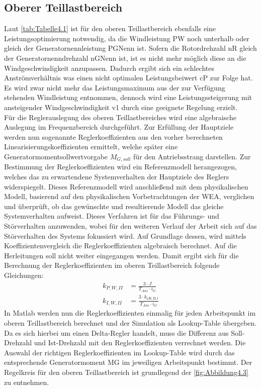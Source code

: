 \subsection{Oberer Teillastbereich}
Laut \autoref{tab:Tabelle4.1} ist für den oberen Teillastbereich ebenfalls eine Leistungsoptimierung notwendig, da die Windleistung \acs{PW} noch unterhalb oder gleich der Generatornennleistung \acs{PGNenn} ist. Sofern die Rotordrehzahl \acs{nR} gleich der Generatornenndrehzahl \acs{nGNenn} ist, ist es nicht mehr möglich diese an die Windgeschwindigkeit anzupassen. Dadurch ergibt sich ein schlechtes Anströmverhältnis was einen nicht optimalen Leistungsbeiwert \acs{cP} zur Folge hat. Es wird zwar nicht mehr das Leistungsmaximum aus der zur Verfügung stehenden Windleistung entnommen, dennoch wird eine Leistungssteigerung mit ansteigender Windgeschwindigkeit \acs{v1} durch eine geeignete Regelung erzielt.\\
Für die Reglerauslegung des oberen Teillastbereiches wird eine algebraische Auslegung im Frequenzbereich durchgeführt. Zur Erfüllung der Hauptziele werden nun sogenannte Reglerkoeffizienten aus den vorher berechneten Linearisierungskoeffizienten ermittelt, welche später eine Generatormomentsollwertvorgabe $M_{G,soll}$ für den Antriebsstrang darstellen. Zur Bestimmung der Reglerkoeffizienten wird ein Referenzmodell herangezogen, welches das zu erwartendene Systemverhalten der Hauptziele des Reglers widerspiegelt. Dieses Referenzmodell wird anschließend mit dem physikalischen Modell, basierend auf den physikalischen Vorbetrachtungen der WEA, verglichen und überprüft, ob das gewünschte und resultierende Modell das gleiche Systemverhalten aufweist. Dieses Verfahren ist für das Führungs- und Störverhalten anzuwenden, wobei für den weiteren Verlauf der Arbeit sich auf das Störverhalten des Systems fokussiert wird. Auf Grundlage dessen, wird mittels Koeffizientenvergleich die Reglerkoeffizienten algebraisch berechnet. Auf die Herleitungen soll nicht weiter eingegangen werden. Damit ergibt sich für die Berechnung der Reglerkoeffizienten im oberen Teillastbereich folgende Gleichungen:
\begin{align}
    k_{P,W,II} &= \frac{3 \cdot J}{T_{Aus} \cdot i_G}   \label{eq:Gleichung4.11}\\
    k_{I,W,II} &= \frac{3 \cdot k_{\omega\mathrm{R,II,i}}}{T_{Aus} \cdot i_G}\label{eq:Gleichung4.12}
\end{align}
\newline
In Matlab werden nun die Reglerkoeffizienten einmalig für jeden Arbeitspunkt im oberen Teillastbereich berechnet und der Simulation als Lookup-Table übergeben. Da es sich hierbei um einen Delta-Regler handelt, muss die Differenz aus Soll-Drehzahl und Ist-Drehzahl mit den Reglerkoeffizienten verrechnet werden. Die Auswahl der richtigen Reglerkoeffizienten im Lookup-Table wird durch das entsprechende Generatormoment \acs{MG} im jeweiligen Arbeitspunkt bestimmt. Der Regelkreis für den oberen Teillastbereich ist grundlegend der \autoref{fig:Abbildung4.3} zu entnehmen.

